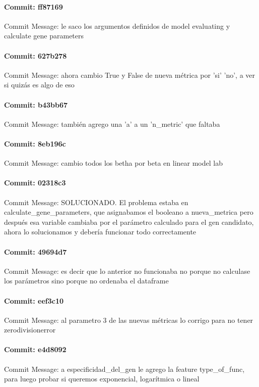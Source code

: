 \documentclass{article}
\begin{document}
\paragraph{Commit: ff87169}
Commit Message: le saco los argumentos definidos de model evaluating y calculate gene parameters

\paragraph{Commit: 627b278}
Commit Message: ahora cambio True y False de nueva métrica por 'si' 'no', a ver si quizás es algo de eso

\paragraph{Commit: b43bb67}
Commit Message: también agrego una 'a' a un 'n_metric' que faltaba

\paragraph{Commit: 8eb196c}
Commit Message: cambio todos los betha por beta en linear model lab

\paragraph{Commit: 02318c3}
Commit Message: SOLUCIONADO. El problema estaba en calculate_gene_parameters, que asignabamos el booleano a nueva_metrica pero después esa variable cambiaba por el parámetro calculado para el gen candidato, ahora lo solucionamos y debería funcionar todo correctamente

\paragraph{Commit: 49694d7}
Commit Message: es decir que lo anterior no funcionaba no porque no calculase los parámetros sino porque no ordenaba el dataframe

\paragraph{Commit: eef3c10}
Commit Message: al parametro 3 de las nuevas métricas lo corrigo para no tener zerodivisionerror

\paragraph{Commit: e4d8092}
Commit Message: a especificidad_del_gen le agrego la feature type_of_func, para luego probar si queremos exponencial, logarítmica o lineal
\end{document}
